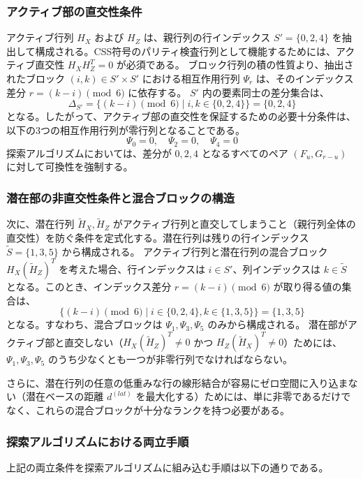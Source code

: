 \documentclass[a4paper,11pt,dvipdfmx]{jsarticle}
\theoremstyle{definition}
\begin{document}
\subsubsection{アクティブ部の直交性条件}
アクティブ行列 $H_X$ および $H_Z$ は、親行列の行インデックス $S' = \{0, 2, 4\}$ を抽出して構成される。CSS符号のパリティ検査行列として機能するためには、アクティブ直交性 $H_X H_Z^T = 0$ が必須である。
ブロック行列の積の性質より、抽出されたブロック $(i, k) \in S' \times S'$ における相互作用行列 $\Psi_r$ は、そのインデックス差分 $r = (k - i) \pmod 6$ に依存する。
$S'$ 内の要素同士の差分集合は、
\[
\Delta_{S'} = \{(k - i) \pmod 6 \mid i, k \in \{0, 2, 4\}\} = \{0, 2, 4\}
\]
となる。したがって、アクティブ部の直交性を保証するための必要十分条件は、以下の3つの相互作用行列が零行列となることである。
\[
\Psi_0 = 0, \quad \Psi_2 = 0, \quad \Psi_4 = 0
\]
探索アルゴリズムにおいては、差分が $0, 2, 4$ となるすべてのペア $(F_u, G_{r-u})$ に対して可換性を強制する。

\subsubsection{潜在部の非直交性条件と混合ブロックの構造}
次に、潜在行列 $\tilde{H}_X, \tilde{H}_Z$ がアクティブ行列と直交してしまうこと（親行列全体の直交性）を防ぐ条件を定式化する。潜在行列は残りの行インデックス $\tilde{S} = \{1, 3, 5\}$ から構成される。
アクティブ行列と潜在行列の混合ブロック $H_X (\tilde{H}_Z)^T$ を考えた場合、行インデックスは $i \in S'$、列インデックスは $k \in \tilde{S}$ となる。このとき、インデックス差分 $r = (k - i) \pmod 6$ が取り得る値の集合は、
\[
\{(k - i) \pmod 6 \mid i \in \{0, 2, 4\}, k \in \{1, 3, 5\}\} = \{1, 3, 5\}
\]
となる。すなわち、混合ブロックは $\Psi_1, \Psi_3, \Psi_5$ のみから構成される。
潜在部がアクティブ部と直交しない（$H_X (\tilde{H}_Z)^T \neq 0$ かつ $H_Z (\tilde{H}_X)^T \neq 0$）ためには、$\Psi_1, \Psi_3, \Psi_5$ のうち少なくとも一つが非零行列でなければならない。

さらに、潜在行列の任意の低重みな行の線形結合が容易にゼロ空間に入り込まない（潜在ベースの距離 $d^{(lat)}$ を最大化する）ためには、単に非零であるだけでなく、これらの混合ブロックが十分なランクを持つ必要がある。

\subsubsection{探索アルゴリズムにおける両立手順}
上記の両立条件を探索アルゴリズムに組み込む手順は以下の通りである。
\end{document}
